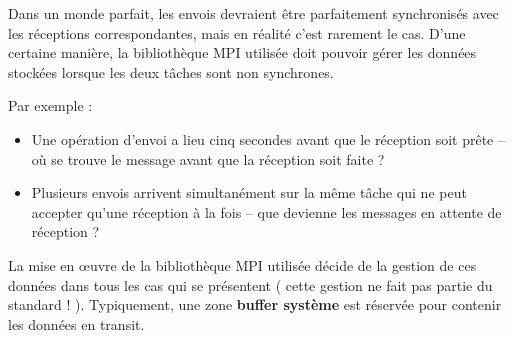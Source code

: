 \documentclass[11pt,a4paper]{article}
\begin{document}
Dans un monde parfait, les envois devraient être parfaitement synchronisés avec les réceptions correspondantes, mais 
en réalité c'est rarement le cas. D'une certaine manière, la bibliothèque MPI utilisée doit pouvoir gérer les données stockées lorsque les deux
tâches sont non synchrones. 

Par exemple :
\begin{itemize}
\item Une opération d'envoi a lieu cinq secondes avant que le réception soit prête -- où se trouve le message avant que la
réception soit faite ?
\item Plusieurs envois arrivent simultanément sur la même tâche qui ne peut accepter qu'une réception à la fois -- que devienne
les messages en attente de réception ?
\end{itemize}

La mise en {\oe}uvre de la bibliothèque MPI utilisée décide de la gestion de ces données dans tous les cas qui se présentent
( cette gestion ne fait pas partie du standard ! ). Typiquement, une zone  \textbf{buffer système} est réservée pour contenir les données
en transit. 
\end{document}
